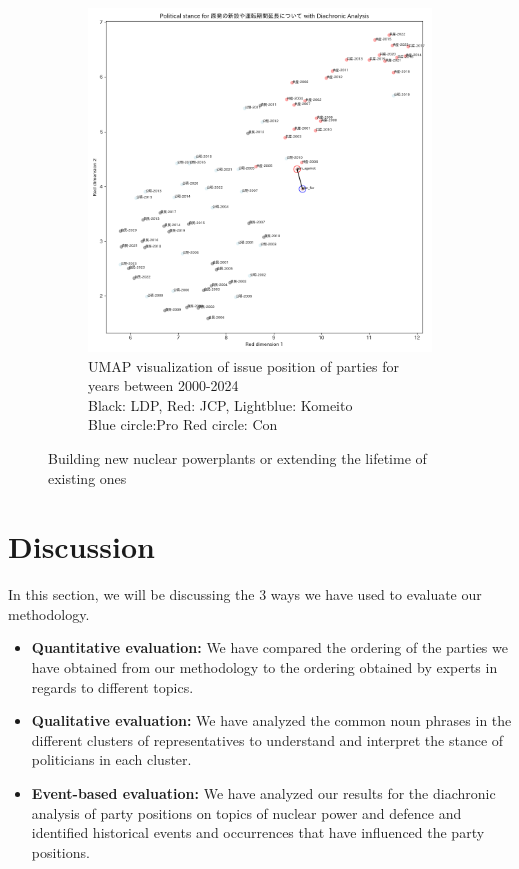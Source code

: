 \documentclass[final,5p,times,twocolumn,authoryear]{elsarticle}
\begin{document}
\begin{figure}[h]
\begin{subfigure}{0.48\textwidth}
		  \includegraphics[width=\textwidth]{figs/results/diachronic_nuclear/原発の新設や運転期間延長について_diachronic_umap.png}
		  \caption{UMAP visualization of issue position of parties for years between 2000-2024\\\hspace{\textwidth} 
		  Black: LDP, Red: JCP, Lightblue: Komeito\\\hspace{\textwidth}
		  Blue circle:Pro Red circle: Con}
		  \label{fig:sub2}
		\end{subfigure}
	\caption{Building new nuclear powerplants or extending the lifetime of existing ones}
	\label{fig: results-diachronic-nuclear-new}
\end{figure}

\clearpage
\twocolumn

\section{Discussion}
In this section, we will be discussing the 3 ways we have used to evaluate our methodology. 
\begin{itemize}
	\item \textbf{Quantitative evaluation:} We have compared the ordering of the parties we have obtained from our methodology to the ordering obtained by experts in regards to different topics. 
	\item \textbf{Qualitative evaluation:} We have analyzed the common noun phrases in the different clusters of representatives to understand and interpret the stance of politicians in each cluster. 
	\item \textbf{Event-based evaluation:} We have analyzed our results for the diachronic analysis of party positions on topics of nuclear power and defence and identified historical events and occurrences that have influenced the party positions.
\end{itemize}
\end{document}
